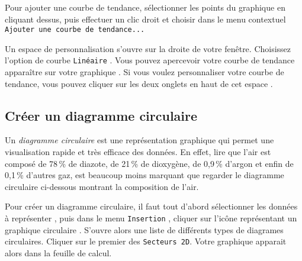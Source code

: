 Pour ajouter une courbe de tendance, sélectionner les points du graphique en cliquant dessus, puis effectuer un clic droit et choisir dans le menu contextuel \texttt{Ajouter une courbe de tendance...}

%

Un espace de personnalisation s'ouvre sur la droite de votre fenêtre. Choisissez l'option de courbe \texttt{Linéaire} . Vous pouvez apercevoir votre courbe de tendance apparaître sur votre graphique . Si vous voulez personnaliser votre courbe de tendance, vous pouvez cliquer sur les deux onglets en haut de cet espace .



\subsection{Créer un diagramme circulaire}\label{Calc2DiagCirculaire}

Un \emph{diagramme circulaire} est une représentation graphique qui permet une visualisation rapide et très efficace des données. En effet, lire que l'air est composé de 78\,\% de diazote, de 21\,\% de dioxygène, de 0,9\,\% d'argon et enfin de 0,1\,\% d'autres gaz, est beaucoup moins marquant que regarder le diagramme circulaire ci-dessous montrant la composition de l'air.


Pour créer un diagramme circulaire, il faut tout d'abord sélectionner les données à représenter , puis dans le menu \texttt{Insertion} , cliquer sur l'icône représentant un graphique circulaire . S'ouvre alors une liste de différents types de diagrames circulaires. Cliquer sur le premier des \texttt{Secteurs 2D}. Votre graphique apparait alors dans la feuille de calcul.



